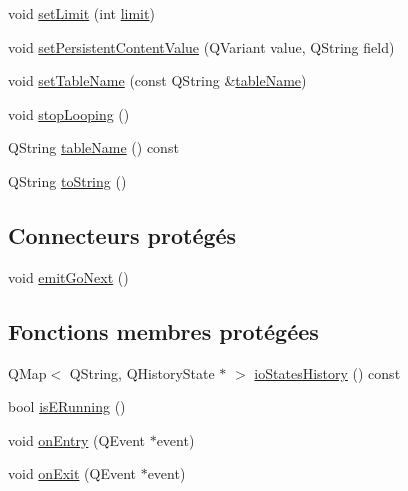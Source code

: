 \begin{DoxyCompactItemize}
\item 
void \hyperlink{classSH__LoopingInOutStateMachine_a6dbf2fbcc6524bba5a70baadb8d61be4}{set\-Limit} (int \hyperlink{classSH__LoopingInOutStateMachine_a7b61682544bd06b52020df3e0d801d21}{limit})
\item 
void \hyperlink{classSH__LoopingInOutStateMachine_a99686121d80e3de4c64bebb1d5890ac0}{set\-Persistent\-Content\-Value} (Q\-Variant value, Q\-String field)
\item 
void \hyperlink{classSH__InOutStateMachine_a95db31a7e7f31f36a8737adc739ab08c}{set\-Table\-Name} (const Q\-String \&\hyperlink{classSH__InOutStateMachine_a4288a6c86ddf83effefff886675591c9}{table\-Name})
\item 
void \hyperlink{classSH__LoopingInOutStateMachine_a73d75e30318da22fec99387e9bf02a9b}{stop\-Looping} ()
\item 
Q\-String \hyperlink{classSH__InOutStateMachine_a4288a6c86ddf83effefff886675591c9}{table\-Name} () const 
\item 
Q\-String \hyperlink{classSH__GenericStateMachine_a85c0c1c9d258ae991f84667412fa47cd}{to\-String} ()
\end{DoxyCompactItemize}
\subsection*{Connecteurs protégés}
\begin{DoxyCompactItemize}
\item 
void \hyperlink{classSH__GenericStateMachine_a2e162a1da1f694d433cb9072b37ac530}{emit\-Go\-Next} ()
\end{DoxyCompactItemize}
\subsection*{Fonctions membres protégées}
\begin{DoxyCompactItemize}
\item 
Q\-Map$<$ Q\-String, Q\-History\-State $\ast$ $>$ \hyperlink{classSH__InOutStateMachine_a13889998c6dcd17db984dd6ed1454e80}{io\-States\-History} () const 
\item 
bool \hyperlink{classSH__InOutStateMachine_ae6c7448fbe267b035017108a9ffdff2e}{is\-E\-Running} ()
\item 
void \hyperlink{classSH__GenericStateMachine_adfd82f2532595ed7c4bcf21f03cbb951}{on\-Entry} (Q\-Event $\ast$event)
\item 
void \hyperlink{classSH__GenericStateMachine_a4b36d60fa1876908493d3d07f191a30f}{on\-Exit} (Q\-Event $\ast$event)
\end{DoxyCompactItemize}
